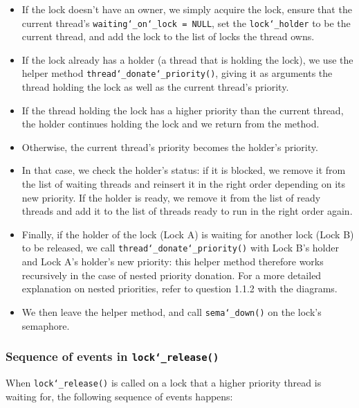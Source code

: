 \documentclass{article}
\renewcommand{\_}{\char`_}
\begin{document}
\begin{itemize}

\item If the lock doesn't have an owner, we simply acquire the lock, ensure that the current thread's \texttt{waiting\_on\_lock = NULL},
set the \texttt{lock\_holder} to be the current thread, and add the lock to the list of locks the thread owns.

\item If the lock already has a holder (a thread that is holding the lock), we use the helper method \texttt{thread\_donate\_priority()}, giving it as arguments the thread holding the lock as well as the current thread's priority.

\item If the thread holding the lock has a higher priority than the current thread, the holder continues holding the lock and we return from the method.

\item Otherwise, the current thread's priority becomes the holder's priority.

\item In that case, we check the holder's status: if it is blocked, we remove it from the list of waiting threads and reinsert it in the right order depending on its new priority. If the holder is ready, we remove it from the list of ready threads and add it to the list of threads ready to run in the right order again.

\item Finally, if the holder of the lock (Lock A) is waiting for another lock (Lock B) to be released, we call \texttt{thread\_donate\_priority()} with Lock B's holder and Lock A's holder's new priority: this helper method therefore works recursively in the case of nested priority donation. For a more detailed explanation on nested priorities, refer to question 1.1.2 with the diagrams.

\item We then leave the helper method, and call \texttt{sema\_down()} on the lock's semaphore.

\end{itemize}

\subsubsection{Sequence of events in \texttt{lock\_release()}}

When \texttt{lock\_release()} is called on a lock that a higher priority thread is waiting for, the following sequence of events happens:
\end{document}
